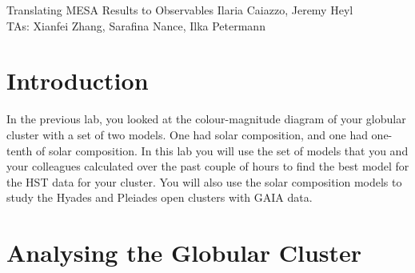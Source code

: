 \documentclass{article}
\begin{document}
\begin{titlebox}{Translating MESA Results to Observables}
Ilaria Caiazzo, Jeremy Heyl \\
TAs: Xianfei Zhang, Sarafina Nance, Ilka Petermann
\end{titlebox}

\section{Introduction}

In the previous lab, you looked at the colour-magnitude diagram of your globular cluster with a set of two models.  One had solar composition, and one had one-tenth of solar composition.  In this lab you will use the set of models that you and your colleagues calculated over the past couple of hours to find the best model for the HST data for your cluster. You will also use the solar composition models to study the Hyades and Pleiades open clusters with GAIA data.

\section{Analysing the Globular Cluster}
\end{document}
